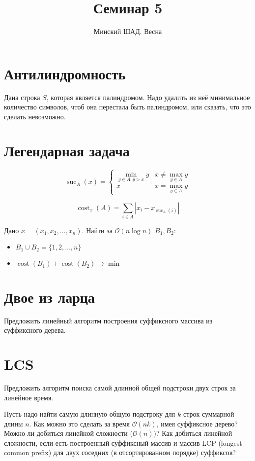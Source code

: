 \documentclass[addpoints]{exam}
\title{Семинар 5}
\author{Минский ШАД. Весна}
\DeclareMathOperator{\cost}{cost}
\DeclareMathOperator{\suc}{suc}
\begin{document}
\maketitle

\section{Антилиндромность}

Дана строка $S$, которая является палиндромом. Надо удалить из неё минимальное количество символов, чтоб она перестала быть палиндромом, или сказать, что это сделать невозможно.

\section{Легендарная задача}


$$
\suc_A(x) = 
 \begin{cases}
  \min\limits_{y \in A, y > x} y & x \neq \max\limits_{y \in A}{y} \\
  x & x = \max\limits_{y \in A}{y}
 \end{cases}
$$

$$\cost_x(A) = \sum\limits_{i \in A} |x_i - x_{\suc_A(i)}|$$

Дано $x = (x_1, x_2, \ldots, x_n)$. Найти за $\mathcal{O}(n \log{n})$ $B_1, B_2$:

\begin{itemize}
\item $B_1 \cup B_2 = \{1, 2, \ldots, n\}$
\item $\cost(B_1) + \cost(B_2) \to \min$
\end{itemize}

\section{Двое из ларца}

Предложить линейный алгоритм построения суффиксного массива из суффиксного дерева. 

\section{LCS}

Предложить алгоритм поиска самой длинной общей подстроки двух строк за линейное время.

Пусть надо найти самую длинную общую подстроку для $k$ строк суммарной длины $n$. Как можно это сделать за время $\mathcal{O}(nk)$, имея суффиксное дерево? Можно ли добиться линейной сложности ($\mathcal{O}(n)$)? Как добиться линейной сложности, если есть построенный суффиксный массив и массив LCP (longest common prefix) для двух соседних (в отсортированном порядке) суффиксов?
\end{document}
